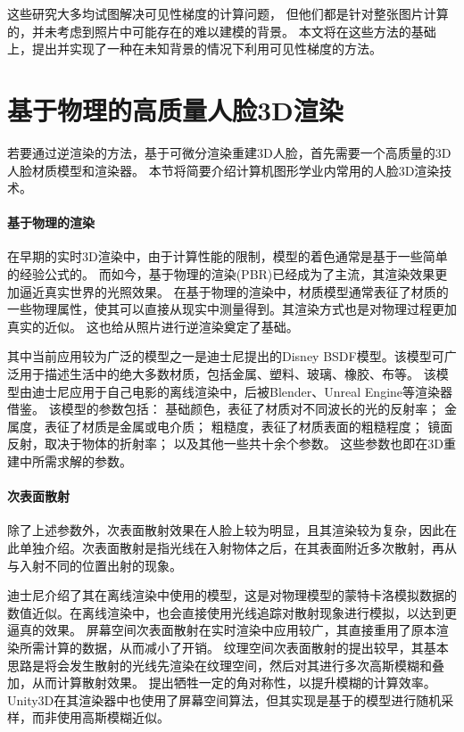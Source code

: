 这些研究大多均试图解决可见性梯度的计算问题，
但他们都是针对整张图片计算的，并未考虑到照片中可能存在的难以建模的背景。
本文将在这些方法的基础上，提出并实现了一种在未知背景的情况下利用可见性梯度的方法。

\section{基于物理的高质量人脸3D渲染}

若要通过逆渲染的方法，基于可微分渲染重建3D人脸，首先需要一个高质量的3D人脸材质模型和渲染器。
本节将简要介绍计算机图形学业内常用的人脸3D渲染技术。

\paragraph{基于物理的渲染}

在早期的实时3D渲染中，由于计算性能的限制，模型的着色通常是基于一些简单的经验公式的。
而如今，基于物理的渲染(PBR)已经成为了主流，其渲染效果更加逼近真实世界的光照效果。
在基于物理的渲染中，材质模型通常表征了材质的一些物理属性，使其可以直接从现实中测量得到。其渲染方式也是对物理过程更加真实的近似。
这也给从照片进行逆渲染奠定了基础。

其中当前应用较为广泛的模型之一是迪士尼提出的Disney BSDF模型\citep{PBR_disney}。该模型可广泛用于描述生活中的绝大多数材质，包括金属、塑料、玻璃、橡胶、布等。
该模型由迪士尼应用于自己电影的离线渲染中，后被Blender、Unreal Engine等渲染器借鉴。
该模型的参数包括：
基础颜色，表征了材质对不同波长的光的反射率；
金属度，表征了材质是金属或电介质；
粗糙度，表征了材质表面的粗糙程度；
镜面反射，取决于物体的折射率；
以及其他一些共十余个参数。
这些参数也即在3D重建中所需求解的参数。

\paragraph{次表面散射}
除了上述参数外，次表面散射效果在人脸上较为明显，且其渲染较为复杂，因此在此单独介绍。次表面散射是指光线在入射物体之后，在其表面附近多次散射，再从与入射不同的位置出射的现象。

迪士尼介绍了其在离线渲染中使用的模型\citep{SSS_disney}，这是对物理模型的蒙特卡洛模拟数据的数值近似。在离线渲染中，也会直接使用光线追踪对散射现象进行模拟，以达到更逼真的效果。
屏幕空间次表面散射\citep{SSSSS}在实时渲染中应用较广，其直接重用了原本渲染所需计算的数据，从而减小了开销。
纹理空间次表面散射\citep{texSSS}的提出较早，其基本思路是将会发生散射的光线先渲染在纹理空间，然后对其进行多次高斯模糊和叠加，从而计算散射效果。
\citet{SpSSS}提出牺牲一定的角对称性，以提升模糊的计算效率。
Unity3D在其渲染器中也使用了屏幕空间算法\citep{SSS_u3d}，但其实现是基于\citet{SSS_disney}的模型进行随机采样，而非使用高斯模糊近似。

